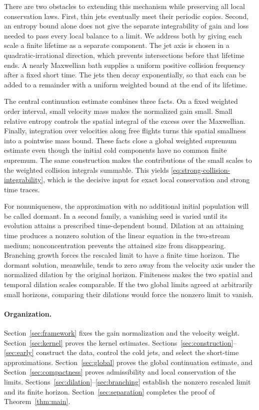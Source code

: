 There are two obstacles to extending this mechanism while preserving all
local conservation laws. First, thin jets eventually meet their periodic
copies. Second, an entropy bound alone does not give the separate
integrability of gain and loss needed to pass every local balance to a
limit. We address both by giving each scale a finite lifetime as a
separate component. The jet axis is chosen in a quadratic-irrational
direction, which prevents intersections before that lifetime ends. A
nearly Maxwellian bath supplies a uniform positive collision frequency
after a fixed short time. The jets then decay exponentially, so that each
can be added to a remainder with a uniform weighted bound at the end of
its lifetime.

The central continuation estimate combines three facts. On a fixed
weighted order interval, small velocity mass makes the normalized gain
small. Small relative entropy controls the spatial integral of the
excess over the Maxwellian. Finally, integration over velocities along
free flights turns this spatial smallness into a pointwise mass bound.
These facts close a global weighted supremum estimate even though the
initial cold components have no common finite supremum. The same
construction makes the contributions of the small scales to the
weighted collision integrals summable. This yields
\eqref{eq:strong-collision-integrability}, which is the decisive input
for exact local conservation and strong time traces.

For nonuniqueness, the approximation with no additional initial
population will be called dormant. In a second family, a vanishing seed
is varied until its evolution attains a prescribed time-dependent bound.
Dilation at an attaining time produces a nonzero solution of the linear
equation in the two-stream medium; nonconcentration prevents the attained
size from disappearing. Branching growth forces the rescaled limit to
have a finite time horizon. The dormant solution, meanwhile, tends to
zero away from the velocity axis under the normalized dilation by the
original horizon. Finiteness makes the two spatial and temporal dilation
scales comparable. If the two global limits agreed at arbitrarily small
horizons, comparing their dilations would force the nonzero limit to
vanish.

\paragraph{Organization.}
Section~\ref{sec:framework} fixes the gain normalization and the velocity
weight. Section~\ref{sec:kernel} proves the kernel estimates.
Sections~\ref{sec:construction}--\ref{sec:early} construct the data,
control the cold jets, and select the short-time approximations.
Section~\ref{sec:global} proves the global continuation estimate, and
Section~\ref{sec:compactness} proves admissibility and local conservation
of the limits. Sections~\ref{sec:dilation}--\ref{sec:branching} establish
the nonzero rescaled limit and its finite horizon.
Section~\ref{sec:separation} completes the proof of
Theorem~\ref{thm:main}.
